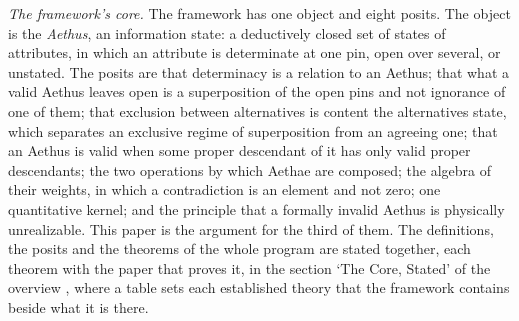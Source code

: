 \documentclass[11pt]{article}
\begin{document}
\emph{The framework's core.} The framework has one object and eight posits. The object is the \emph{Aethus}, an information state: a deductively closed set of states of attributes, in which an attribute is determinate at one pin, open over several, or unstated. The posits are that determinacy is a relation to an Aethus; that what a valid Aethus leaves open is a superposition of the open pins and not ignorance of one of them; that exclusion between alternatives is content the alternatives state, which separates an exclusive regime of superposition from an agreeing one; that an Aethus is valid when some proper descendant of it has only valid proper descendants; the two operations by which Aethae are composed; the algebra of their weights, in which a contradiction is an element and not zero; one quantitative kernel; and the principle that a formally invalid Aethus is physically unrealizable. This paper is the argument for the third of them. The definitions, the posits and the theorems of the whole program are stated together, each theorem with the paper that proves it, in the section `The Core, Stated' of the overview \parencite{AethusBrief}, where a table sets each established theory that the framework contains beside what it is there.
\end{document}
